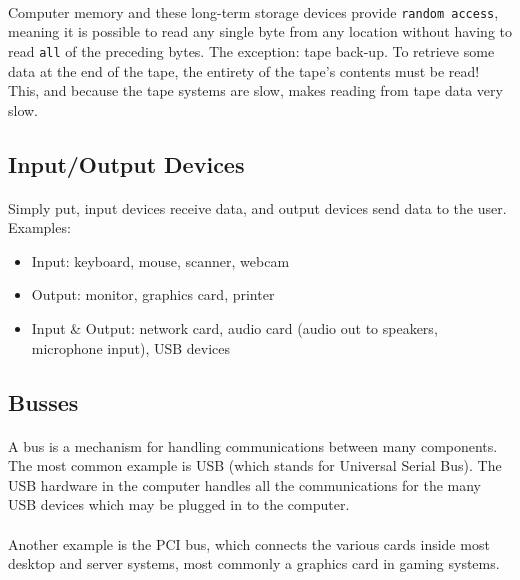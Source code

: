 \documentclass[letter,11pt]{article}
\begin{document}
\paragraph{}Computer memory and these long-term storage devices provide \texttt{random access}, meaning it is possible to read any single byte from any location without having to read \texttt{all} of the preceding bytes. The exception: tape back-up. To retrieve some data at the end of the tape, the entirety of the tape's contents must be read! This, and because the tape systems are slow, makes reading from tape data very slow.

\subsection{Input/Output Devices}
\paragraph{}Simply put, input devices receive data, and output devices send data to the user. Examples:
\begin{itemize}
    \item Input: keyboard, mouse, scanner, webcam
    \item Output: monitor, graphics card, printer
    \item Input \& Output: network card, audio card (audio out to speakers, microphone input), USB devices
\end{itemize}

\subsection{Busses}
\paragraph{}A bus is a mechanism for handling communications between many components. The most common example is USB (which stands for Universal Serial Bus). The USB hardware in the computer handles all the communications for the many USB devices which may be plugged in to the computer.

\paragraph{}Another example is the PCI bus, which connects the various cards inside most desktop and server systems, most commonly a graphics card in gaming systems.
\end{document}

